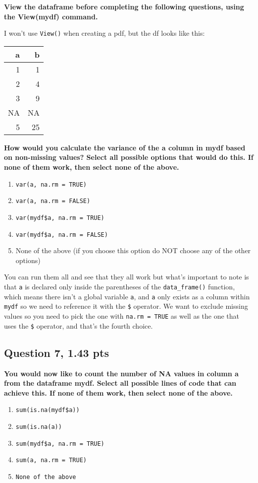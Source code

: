 \documentclass[11pt]{article}
\begin{document}
\textbf{View the dataframe before completing the following questions, using the View(mydf) command.}

I won't use \texttt{View()} when creating a pdf, but the df looks like this:

\begin{center}
\begin{tabular}{rr}
a & b\\[0pt]
\hline
1 & 1\\[0pt]
2 & 4\\[0pt]
3 & 9\\[0pt]
NA & NA\\[0pt]
5 & 25\\[0pt]
\end{tabular}
\end{center}

\textbf{How would you calculate the variance of the a column in mydf based on non-missing values? Select all possible options that would do this. If none of them work, then select none of the above.}

\begin{enumerate}
\item \texttt{var(a, na.rm = TRUE)}
\item \texttt{var(a, na.rm = FALSE)}
\item \texttt{var(mydf\$a, na.rm = TRUE)}
\item \texttt{var(mydf\$a, na.rm = FALSE)}
\item None of the above (if you choose this option do NOT choose any of the other options)
\end{enumerate}


You can run them all and see that they all work but what's important to note is that \texttt{a} is declared only inside the parentheses of the \texttt{data\_frame()} function, which means there isn't a global variable \texttt{a}, and \texttt{a} only exists as a column within \texttt{mydf} so we need to reference it with the \texttt{\$} operator.  We want to exclude missing values so you need to pick the one with \texttt{na.rm = TRUE} as well as the one that uses the \texttt{\$} operator, and that's the fourth choice.

\subsection*{Question 7, 1.43 pts}
\label{sec:orga9c07c0}
\textbf{You would now like to count the number of NA values in column a from the dataframe mydf. Select all possible lines of code that can achieve this. If none of them work, then select none of the above.}
\begin{enumerate}
\item \texttt{sum(is.na(mydf\$a))}
\item \texttt{sum(is.na(a))}
\item \texttt{sum(mydf\$a, na.rm = TRUE)}
\item \texttt{sum(a, na.rm = TRUE)}
\item \texttt{None of the above}
\end{enumerate}
\end{document}
